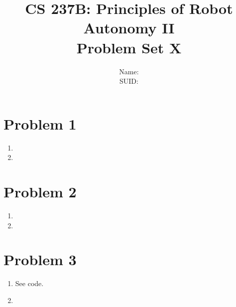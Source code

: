 \documentclass{article}
\title{CS 237B: Principles of Robot Autonomy II \\ Problem Set X}
\author{Name:      \\ SUID:}
\date{}
\begin{document}
\maketitle
\pagestyle{fancy} 




\section*{Problem 1}
\begin{enumerate}[label=(\roman*)]
\item
\item

\end{enumerate}



\section*{Problem 2}
\begin{enumerate}[label=(\roman*)]
\item
\item

\end{enumerate}



\section*{Problem 3}
\begin{enumerate}[label=(\roman*)]
\item See code.
\item

\end{enumerate}
\end{document}
